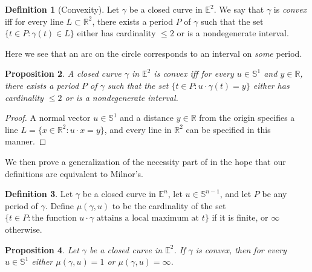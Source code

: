 \documentclass{amsart}
\newtheorem{proposition}{Proposition}[section]
\theoremstyle{definition}
\newtheorem{definition}[proposition]{Definition}
\theoremstyle{remark}
\begin{document}
\begin{definition}[Convexity]
    Let $\gamma$ be a closed curve in $\mathbb{E}^2$.
    We say that $\gamma$ is \emph{convex} iff
    for every line $L\subset\mathbb{R}^2$,
    there exists a period $P$ of $\gamma$ such that
    the set $\{t\in P:\gamma(t)\in L\}$ either
    has cardinality $\le2$ or is a nondegenerate interval.
\end{definition}

Here we see that an arc on the circle corresponds
to an interval on \emph{some} period.

\begin{proposition}
    A closed curve $\gamma$ in $\mathbb{E}^2$ is convex iff
    for every $u\in\mathbb{S}^1$ and $y\in\mathbb{R}$,
    there exists a period $P$ of $\gamma$ such that
    the set $\{t\in P:u\cdot\gamma(t)=y\}$ either
    has cardinality $\le2$ or is a nondegenerate interval.
\end{proposition}

\begin{proof}
    A normal vector $u\in\mathbb{S}^1$ and
    a distance $y\in\mathbb{R}$ from the origin specifies
    a line $L=\{x\in\mathbb{R}^2:u\cdot x=y\}$, and
    every line in $\mathbb{R}^2$ can be specified in this manner.
\end{proof}

We then prove a generalization of the necessity part
of \cite[Lemma 3.3]{milnor} in the hope that
our definitions are equivalent to Milnor's.

\begin{definition}
    Let $\gamma$ be a closed curve in $\mathbb{E}^n$,
    let $u\in\mathbb{S}^{n-1}$,
    and let $P$ be any period of $\gamma$.
    Define $\mu(\gamma,u)$ to be the cardinality of the set
    $\{t\in P:\text{the function }u\cdot\gamma\text{ attains a local maximum at }t\}$
    if it is finite, or $\infty$ otherwise.
\end{definition}

\begin{proposition}
    Let $\gamma$ be a closed curve in $\mathbb{E}^2$.
    If $\gamma$ is convex, then for every $u\in\mathbb{S}^1$
    either $\mu(\gamma,u)=1$ or $\mu(\gamma,u)=\infty$.
\end{proposition}
\end{document}
